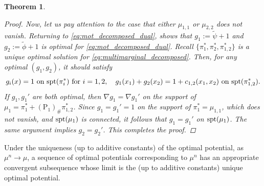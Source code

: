 \documentclass{amsart}
\theoremstyle{plain}
\numberwithin{equation}{section}\newtheorem{theorem}{Theorem}[section]
\theoremstyle{remark}
\newcommand{\spt}{\textup{spt}}
\begin{document}
\begin{theorem}
\begin{proof}
Now, let us pay attention to the case that either $\mu_{1,1}$ or $\mu_{2,2}$ does not vanish. Returning to \eqref{eq:mot_decomposed_dual},  shows that $g_1:= \tilde\psi + 1$ and $g_2:= \tilde\phi + 1$ is optimal for \eqref{eq:mot_decomposed_dual}. Recall $\{\pi^*_{1}, \pi^*_2, \pi^*_{1,2} \}$ is a unique optimal solution for \eqref{eq:multimarginal_decomposed}. Then, for any optimal $(g_1, g_2)$, it should satisfy
\[
    g_i(x) = 1 \text{ on $\spt(\pi^*_i)$ for $i=1,2$}, \quad g_1(x_1) + g_2(x_2) = 1 + c_{1,2}(x_1, x_2) \text{ on $\spt(\pi^*_{1,2})$}.
\]
If $g_1, g_1'$ are both optimal, then $\nabla g_1 = \nabla g_1'$ on the support of $\mu_1=\pi^*_1 + (\mathrm{P}_1)_\#\pi^*_{1,2}$. Since $g_1=g_1'=1$ on the support of $\pi^*_1=\mu_{1,1}$, which does not vanish, and $\spt(\mu_1)$ is connected, it follows that $g_1=g_1'$ on $\spt(\mu_1)$. The same argument implies $g_2=g_2'$. This completes the proof.
\end{proof}
\end{theorem}





Under the uniqueness (up to additive constants) of the optimal potential, as $\mu^n \to \mu$, a sequence of optimal potentials corresponding to $\mu^n$ has an appropriate convergent subsequence whose limit is the (up to additive constants) unique optimal potential.
\end{document}
